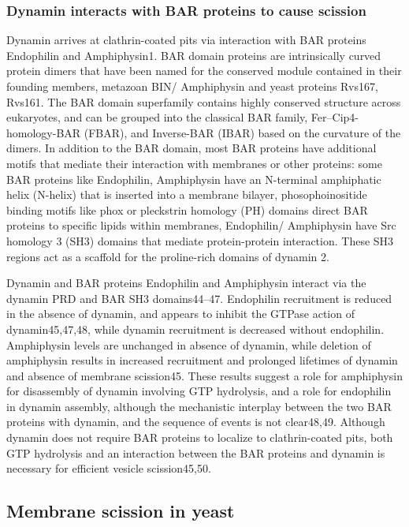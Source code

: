 		\subsubsection{Dynamin interacts with BAR proteins to cause scission}
		Dynamin arrives at clathrin-coated pits via interaction with BAR proteins Endophilin and Amphiphysin1. BAR domain proteins are intrinsically curved protein dimers that have been named for the conserved module contained in their founding members, metazoan BIN/ Amphiphysin and yeast proteins Rvs167, Rvs161. The BAR domain superfamily contains highly conserved structure across eukaryotes, and can be grouped into the classical BAR family, Fer–Cip4-homology-BAR (FBAR), and Inverse-BAR (IBAR) based on the curvature of the dimers. In addition to the BAR domain, most BAR proteins have additional motifs that mediate their interaction with membranes or other proteins: some BAR proteins like Endophilin, Amphiphysin have an N-terminal amphiphatic helix (N-helix) that is inserted into a membrane bilayer, phosophoinositide binding motifs like phox or pleckstrin homology (PH) domains direct BAR proteins to specific lipids within membranes, Endophilin/ Amphiphysin have Src homology 3 (SH3) domains that mediate protein-protein interaction. These SH3 regions act as a scaffold for the proline-rich domains of dynamin 2. 

		\vspace{5mm}
		Dynamin and BAR proteins Endophilin and Amphiphysin interact via the dynamin PRD and BAR SH3 domains44–47. Endophilin recruitment is reduced in the absence of dynamin, and appears to inhibit the GTPase action of dynamin45,47,48, while dynamin recruitment is decreased without endophilin. Amphiphysin levels are unchanged in absence of dynamin, while deletion of amphiphysin results in increased recruitment and prolonged lifetimes of dynamin and absence of membrane scission45. These results suggest a role for amphiphysin for disassembly of dynamin involving GTP hydrolysis, and a role for endophilin in dynamin assembly, although the mechanistic interplay between the two BAR proteins with dynamin, and the sequence of events is not clear48,49. Although dynamin does not require BAR proteins to localize to clathrin-coated pits, both GTP hydrolysis and an interaction between the BAR proteins and dynamin is necessary for efficient vesicle scission45,50.


	\subsection{Membrane scission in yeast} \label {yeast_scission}
